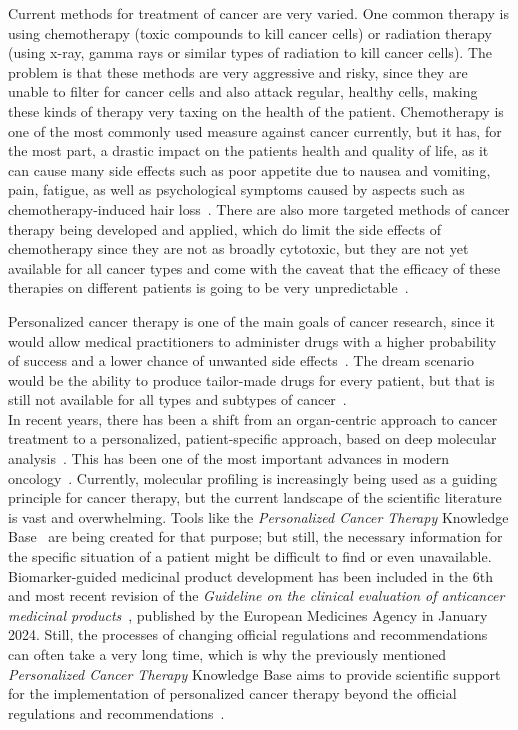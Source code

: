 Current methods for treatment of cancer are very varied. One common therapy is using chemotherapy (toxic compounds to kill cancer cells) or radiation therapy (using x-ray, gamma rays or similar types of radiation to kill cancer cells). The problem is that these methods are very aggressive and risky, since they are unable to filter for cancer cells and also attack regular, healthy cells, making these kinds of therapy very taxing on the health of the patient. Chemotherapy is one of the most commonly used measure against cancer currently, but it has, for the most part, a drastic impact on the patients health and quality of life, as it can cause many side effects such as poor appetite due to nausea and vomiting, pain, fatigue, as well as psychological symptoms caused by aspects such as chemotherapy-induced hair loss~\cite{cancer-chemotherapy-and-beyond}. There are also more targeted methods of cancer therapy being developed and applied, which do limit the side effects of chemotherapy since they are not as broadly cytotoxic, but they are not yet available for all cancer types and come with the caveat that the efficacy of these therapies on different patients is going to be very unpredictable~\cite{cancer-chemotherapy-and-beyond}.

Personalized cancer therapy is one of the main goals of cancer research, since it would allow medical practitioners to administer drugs with a higher probability of success and a lower chance of unwanted side effects~\cite{meric2012overcoming}. The dream scenario would be the ability to produce tailor-made drugs for every patient, but that is still not available for all types and subtypes of cancer~\cite{personalized_cancer_medicine}.\\
In recent years, there has been a shift from an organ-centric approach to cancer treatment to a personalized, patient-specific approach, based on deep molecular analysis~\cite{personlized-medicine-recent-progress-cancer}. This has been one of the most important advances in modern oncology~\cite{personlized-medicine-recent-progress-cancer}. Currently, molecular profiling is increasingly being used as a guiding principle for cancer therapy, but the current landscape of the scientific literature is vast and overwhelming. Tools like the \textit{Personalized Cancer Therapy} Knowledge Base~\cite{personalized-cancer-therapy} are being created for that purpose; but still, the necessary information for the specific situation of a patient might be difficult to find or even unavailable. Biomarker-guided medicinal product development has been included in the 6th and most recent revision of the \textit{Guideline on the clinical evaluation of anticancer medicinal products}~\cite{ema_guideline}, published by the European Medicines Agency in January 2024. Still, the processes of changing official regulations and recommendations can often take a very long time, which is why the previously mentioned \textit{Personalized Cancer Therapy} Knowledge Base aims to provide scientific support for the implementation of personalized cancer therapy beyond the official regulations and recommendations~\cite{personalized-cancer-therapy}.

